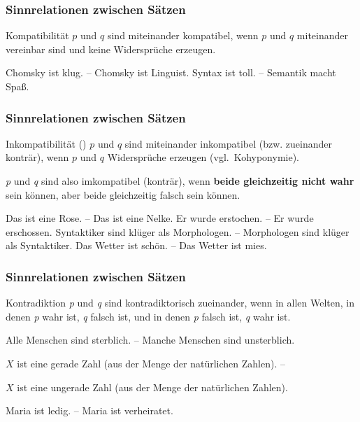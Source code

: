\begin{frame}
\frametitle{Sinnrelationen zwischen Sätzen}

\begin{block}{Kompatibilität}
$p$ und $q$ sind miteinander kompatibel, wenn $p$ und $q$ miteinander vereinbar sind und keine Widersprüche erzeugen.
\end{block}

	\ea Chomsky ist klug. -- Chomsky ist Linguist.
	\ex Syntax ist toll. -- Semantik macht Spa\ss{}.
	\z
		
\end{frame}


\begin{frame}
\frametitle{Sinnrelationen zwischen Sätzen}
	
\begin{block}{Inkompatibilität ()}
$p$ und $q$ sind miteinander inkompatibel (bzw. zueinander konträr), wenn $p$ und $q$ Widersprüche erzeugen (vgl.\ Kohyponymie).

\textit{p} und \textit{q} sind also imkompatibel (konträr), wenn \textbf{beide gleichzeitig nicht wahr} sein können, aber beide gleichzeitig falsch sein können.
\end{block}

	\ea Das ist eine Rose. -- Das ist eine Nelke.
	\ex Er wurde erstochen. -- Er wurde erschossen.
	\ex Syntaktiker sind klüger als Morphologen. -- Morphologen sind klüger als Syntaktiker.		
	\ex Das Wetter ist schön. -- Das Wetter ist mies.
	\z
\end{frame}


\begin{frame}
\frametitle{Sinnrelationen zwischen Sätzen}

\begin{block}{Kontradiktion}
\textit{p} und \textit{q} sind kontradiktorisch zueinander, wenn in allen Welten, in denen \textit{p} wahr ist, \textit{q} falsch ist, und in denen \textit{p} falsch ist, \textit{q} wahr ist.
\end{block}
	
\ea Alle Menschen sind sterblich. -- Manche Menschen sind unsterblich.

\ex $X$ ist eine gerade Zahl (aus der Menge der natürlichen Zahlen). -- 

$X$ ist eine ungerade Zahl (aus der Menge der natürlichen Zahlen).

\ex Maria ist ledig. -- Maria ist verheiratet.
\z

\end{frame}



